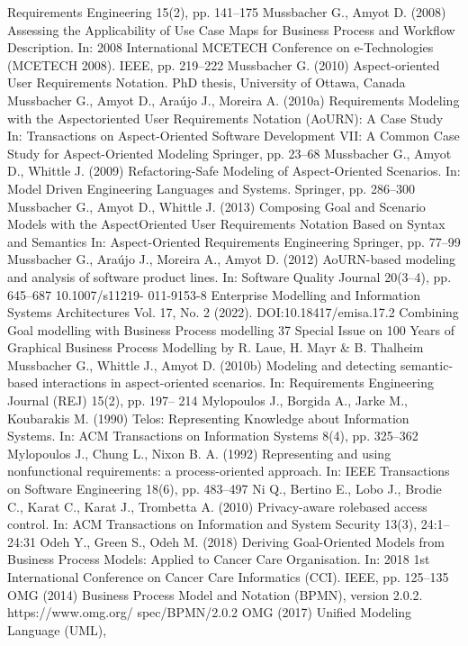 Requirements Engineering 15(2), pp. 141–175
Mussbacher G., Amyot D. (2008) Assessing the
Applicability of Use Case Maps for Business Process and Workflow Description. In: 2008 International MCETECH Conference on e-Technologies
(MCETECH 2008). IEEE, pp. 219–222
Mussbacher G. (2010) Aspect-oriented User Requirements Notation. PhD thesis, University of
Ottawa, Canada
Mussbacher G., Amyot D., Araújo J., Moreira A.
(2010a) Requirements Modeling with the Aspectoriented User Requirements Notation (AoURN): A
Case Study In: Transactions on Aspect-Oriented
Software Development VII: A Common Case
Study for Aspect-Oriented Modeling Springer,
pp. 23–68
Mussbacher G., Amyot D., Whittle J. (2009)
Refactoring-Safe Modeling of Aspect-Oriented
Scenarios. In: Model Driven Engineering Languages and Systems. Springer, pp. 286–300
Mussbacher G., Amyot D., Whittle J. (2013) Composing Goal and Scenario Models with the AspectOriented User Requirements Notation Based on
Syntax and Semantics In: Aspect-Oriented Requirements Engineering Springer, pp. 77–99
Mussbacher G., Araújo J., Moreira A., Amyot
D. (2012) AoURN-based modeling and analysis
of software product lines. In: Software Quality
Journal 20(3–4), pp. 645–687 10.1007/s11219-
011-9153-8
Enterprise Modelling and Information Systems Architectures
Vol. 17, No. 2 (2022). DOI:10.18417/emisa.17.2
Combining Goal modelling with Business Process modelling 37
Special Issue on 100 Years of Graphical Business Process Modelling by R. Laue, H. Mayr & B. Thalheim
Mussbacher G., Whittle J., Amyot D. (2010b)
Modeling and detecting semantic-based interactions in aspect-oriented scenarios. In: Requirements Engineering Journal (REJ) 15(2), pp. 197–
214
Mylopoulos J., Borgida A., Jarke M., Koubarakis
M. (1990) Telos: Representing Knowledge about
Information Systems. In: ACM Transactions on
Information Systems 8(4), pp. 325–362
Mylopoulos J., Chung L., Nixon B. A. (1992) Representing and using nonfunctional requirements: a
process-oriented approach. In: IEEE Transactions
on Software Engineering 18(6), pp. 483–497
Ni Q., Bertino E., Lobo J., Brodie C., Karat C.,
Karat J., Trombetta A. (2010) Privacy-aware rolebased access control. In: ACM Transactions on
Information and System Security 13(3), 24:1–
24:31
Odeh Y., Green S., Odeh M. (2018) Deriving
Goal-Oriented Models from Business Process
Models: Applied to Cancer Care Organisation. In:
2018 1st International Conference on Cancer Care
Informatics (CCI). IEEE, pp. 125–135
OMG (2014) Business Process Model and Notation (BPMN), version 2.0.2. https://www.omg.org/
spec/BPMN/2.0.2
OMG (2017) Unified Modeling Language (UML),
